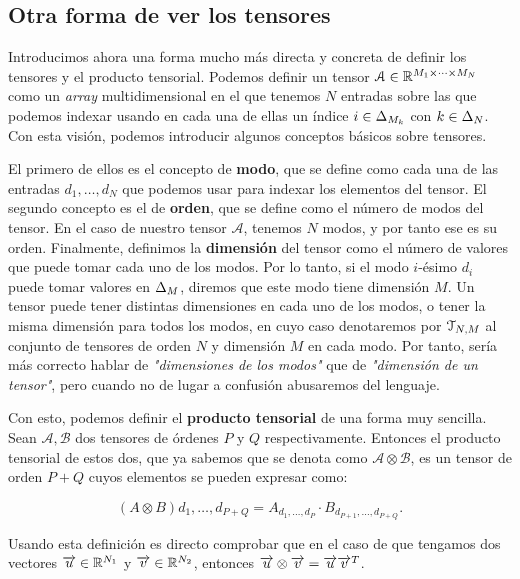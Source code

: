\subsection{Otra forma de ver los tensores} \label{sec:otra_forma_tensores}

Introducimos ahora una forma mucho más directa y concreta de definir los tensores y el producto tensorial. Podemos definir un tensor $\mathcal{A} \in \mathbb{R}^{M_1 \times \cdots \times M_N}$ como un \textit{array} multidimensional en el que tenemos $N$ entradas sobre las que podemos indexar usando en cada una de ellas un índice $i \in \Delta_{M_k}$ con $k \in \Delta_{N}$. Con esta visión, podemos introducir algunos conceptos básicos sobre tensores.

El primero de ellos es el concepto de \textbf{modo}, que se define como cada una de las entradas $d_1, \ldots, d_N$ que podemos usar para indexar los elementos del tensor. El segundo concepto es el de \textbf{orden}, que se define como el número de modos del tensor. En el caso de nuestro tensor $\mathcal{A}$, tenemos $N$ modos, y por tanto ese es su orden. Finalmente, definimos la \textbf{dimensión} del tensor como el número de valores que puede tomar cada uno de los modos. Por lo tanto, si el modo $i$-ésimo $d_i$ puede tomar valores en $\Delta_{M}$, diremos que este modo tiene dimensión $M$. Un tensor puede tener distintas dimensiones en cada uno de los modos, o tener la misma dimensión para todos los modos, en cuyo caso denotaremos por $\mathcal{T}_{N, M}$ al conjunto de tensores de orden $N$ y dimensión $M$ en cada modo. Por tanto, sería más correcto hablar de \textit{"dimensiones de los modos"} que de \textit{"dimensión de un tensor"}, pero cuando no de lugar a confusión abusaremos del lenguaje.

Con esto, podemos definir el \textbf{producto tensorial} de una forma muy sencilla. Sean $\mathcal{A}, \mathcal{B}$ dos tensores de órdenes $P$ y $Q$ respectivamente. Entonces el producto tensorial de estos dos, que ya sabemos que se denota como $\mathcal{A} \otimes \mathcal{B}$, es un tensor de orden $P + Q$ cuyos elementos se pueden expresar como:

$$(A \otimes B)d_1, \ldots, d_{P + Q} = A_{d_1, \ldots, d_P} \cdot B_{d_{P + 1}, \ldots, d_{P + Q}}.$$

\begin{observacion}
    Usando esta definición es directo comprobar que en el caso de que tengamos dos vectores $\overrightarrow{u} \in \mathbb{R}^{N_1}$ y $\overrightarrow{v} \in \mathbb{R}^{N_2}$, entonces $\overrightarrow{u} \otimes \overrightarrow{v} = \overrightarrow{u} \overrightarrow{v}^T$.
\end{observacion}

